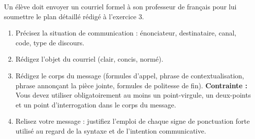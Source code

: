 \documentclass[11pt]{article}
\begin{document}
\begin{exercice}
Un élève doit envoyer un courriel formel à son professeur de français pour lui soumettre le plan détaillé rédigé à l'exercice 3.
\begin{enumerate}
    \item Précisez la situation de communication : énonciateur, destinataire, canal, code, type de discours.
    \item Rédigez l'objet du courriel (clair, concis, normé).
    \item Rédigez le corps du message (formules d'appel, phrase de contextualisation, phrase annonçant la pièce jointe, formules de politesse de fin). \textbf{Contrainte :} Vous devez utiliser obligatoirement au moins un point-virgule, un deux-points et un point d'interrogation dans le corps du message.
    \item Relisez votre message : justifiez l'emploi de chaque signe de ponctuation forte utilisé au regard de la syntaxe et de l'intention communicative.
\end{enumerate}
\end{exercice}
\end{document}
